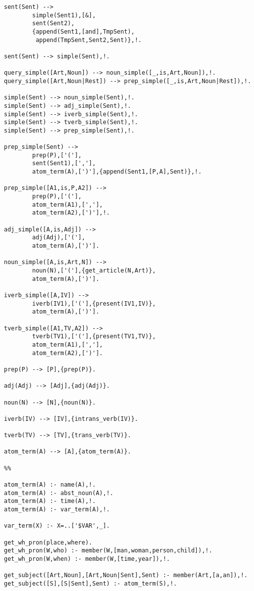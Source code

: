 \begin{verbatim}
sent(Sent) -->
        simple(Sent1),[&],
        sent(Sent2),
        {append(Sent1,[and],TmpSent),
         append(TmpSent,Sent2,Sent)},!.

sent(Sent) --> simple(Sent),!.

query_simple([Art,Noun]) --> noun_simple([_,is,Art,Noun]),!.
query_simple([Art,Noun|Rest]) --> prep_simple([_,is,Art,Noun|Rest]),!.

simple(Sent) --> noun_simple(Sent),!.
simple(Sent) --> adj_simple(Sent),!.
simple(Sent) --> iverb_simple(Sent),!.
simple(Sent) --> tverb_simple(Sent),!.
simple(Sent) --> prep_simple(Sent),!.

prep_simple(Sent) -->
        prep(P),['('],
        sent(Sent1),[','],
        atom_term(A),[')'],{append(Sent1,[P,A],Sent)},!.

prep_simple([A1,is,P,A2]) -->
        prep(P),['('],
        atom_term(A1),[','],
        atom_term(A2),[')'],!.

adj_simple([A,is,Adj]) -->
        adj(Adj),['('],
        atom_term(A),[')'].

noun_simple([A,is,Art,N]) -->
        noun(N),['('],{get_article(N,Art)},
        atom_term(A),[')'].

iverb_simple([A,IV]) -->
        iverb(IV1),['('],{present(IV1,IV)},
        atom_term(A),[')'].

tverb_simple([A1,TV,A2]) -->
        tverb(TV1),['('],{present(TV1,TV)},
        atom_term(A1),[','],
        atom_term(A2),[')'].

prep(P) --> [P],{prep(P)}.

adj(Adj) --> [Adj],{adj(Adj)}.

noun(N) --> [N],{noun(N)}.

iverb(IV) --> [IV],{intrans_verb(IV)}.

tverb(TV) --> [TV],{trans_verb(TV)}.

atom_term(A) --> [A],{atom_term(A)}.

%%

atom_term(A) :- name(A),!.
atom_term(A) :- abst_noun(A),!.
atom_term(A) :- time(A),!.
atom_term(A) :- var_term(A),!.

var_term(X) :- X=..['$VAR',_].

get_wh_pron(place,where).
get_wh_pron(W,who) :- member(W,[man,woman,person,child]),!.
get_wh_pron(W,when) :- member(W,[time,year]),!.

get_subject([Art,Noun],[Art,Noun|Sent],Sent) :- member(Art,[a,an]),!.
get_subject([S],[S|Sent],Sent) :- atom_term(S),!.


\end{verbatim}

